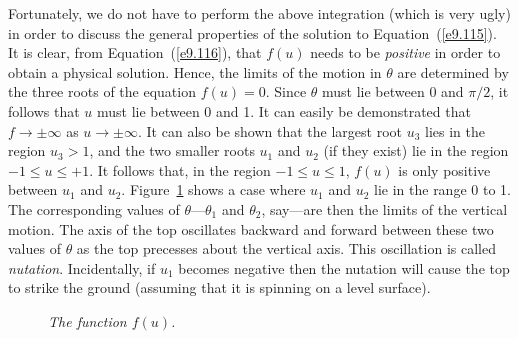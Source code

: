 Fortunately, we do not have to perform the above integration (which is very ugly)
in order to discuss the general properties of the solution to
Equation~(\ref{e9.115}). It is clear, from Equation~(\ref{e9.116}), that $f(u)$
needs to be {\em positive}\/ in order to obtain a physical solution. Hence, the
limits of the motion in $\theta$ are determined by the three roots of the
equation $f(u)=0$. Since $\theta$ must lie between $0$ and $\pi/2$,
it follows that $u$ must lie between 0 and 1. It can easily be demonstrated that 
$f\rightarrow\pm\infty$ as $u\rightarrow\pm\infty$. It can also be shown
that the
largest root $u_3$ lies in the region $u_3>1$, and the two smaller
roots $u_1$ and $u_2$ (if they exist) lie in the region $-1\leq u\leq +1$.
It follows that, in the region $-1\leq u\leq 1$, $f(u)$ is only positive between $u_1$ and $u_2$. 
Figure~\ref{fcurve} shows
a case where $u_1$ and $u_2$ lie in the range
0 to 1. The corresponding values of $\theta$---$\theta_1$ and $\theta_2$, say---are then the limits of the vertical motion.
The axis of the top oscillates backward and forward between these two
values of $\theta$ as the top precesses about the vertical axis. This
oscillation is called {\em nutation}. Incidentally, if $u_1$ becomes
negative then the nutation will cause the top to strike the ground (assuming
that it is spinning on a level surface).

\begin{figure}
\epsfysize=2.5in
\centerline{}
\caption{\em The function $f(u)$.}\label{fcurve}
\end{figure}


